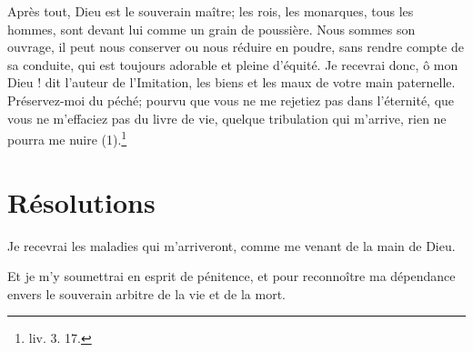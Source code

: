 \documentclass[instructions.tex]{subfiles}
\begin{document}
Après tout, Dieu est le souverain maître; les rois, les monarques, tous les hommes, sont devant lui comme un grain de poussière. Nous sommes son ouvrage, il peut nous conserver ou nous réduire en poudre, sans rendre compte de sa conduite, qui est toujours adorable et pleine d’équité. Je recevrai donc, ô mon Dieu ! dit l’auteur de l’Imitation, les biens et les maux de votre main paternelle. Préservez-moi du péché; pourvu que vous ne me rejetiez pas dans l’éternité, que vous ne m’effaciez pas du livre de vie, quelque tribulation qui m’arrive, rien ne pourra me nuire (1).\footnote{liv. 3. 17.}
 
\section{Résolutions}
 
\primo Je recevrai les maladies qui m’arriveront, comme me venant de la main de Dieu.
 
\secundo Et je m’y soumettrai en esprit de pénitence, et pour reconnoître ma dépendance envers le souverain arbitre de la vie et de la mort. 


 
\end{document}
